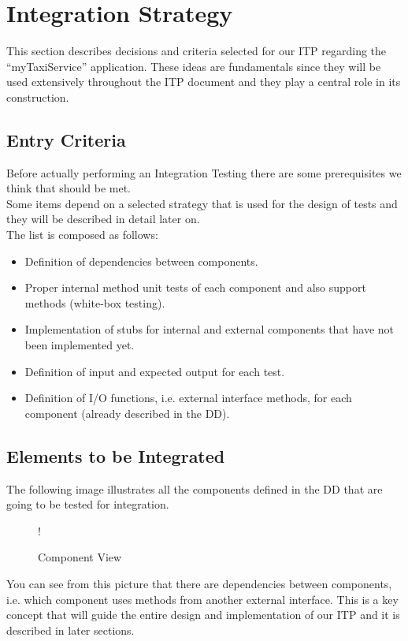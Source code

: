 \break
\section{Integration Strategy}
This section describes decisions and criteria selected for our ITP regarding the ``myTaxiService'' application. These ideas are fundamentals since they will be used extensively throughout the ITP document and they play a central role in its construction.
\subsection{Entry Criteria}
Before actually performing an Integration Testing there are some prerequisites we think that should be met. \\ Some items depend on a selected strategy that is used for the design of tests and they will be described in detail later on. \\
The list is composed as follows:
\begin{itemize}
	\item Definition of dependencies between components.
	\item Proper internal method unit tests of each component and also support methods (white-box testing).
	\item Implementation of stubs for internal and external components that have not been implemented yet.
	\item Definition of input and expected output for each test.
	\item Definition of I/O functions, i.e. external interface methods, for each component (already described in the DD).
\end{itemize} 
\break
\subsection{Elements to be Integrated}
The following image illustrates all the components defined in the DD that are going to be tested for integration.
\begin{figure}[H]
	\centering
	\resizebox{6in}
	{!}{}
	\label{Figure 1:}\caption{Component View}
\end{figure}
You can see from this picture that there are dependencies between components, i.e. which component uses methods from another external interface. This is a key concept that will guide the entire design and implementation of our ITP and it is described in later sections.
